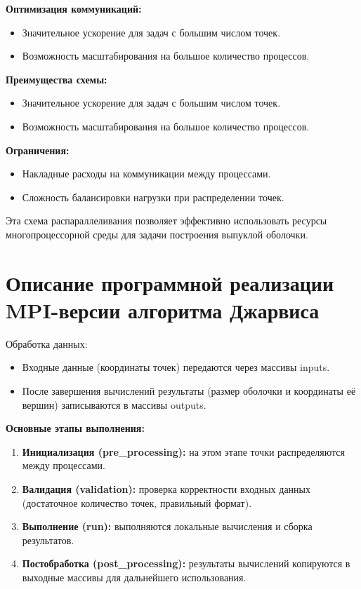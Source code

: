 \documentclass[a4paper,12pt]{article}
\begin{document}
\textbf{Оптимизация коммуникаций:}
\begin{itemize}
    \item Значительное ускорение для задач с большим числом точек.
    \item Возможность масштабирования на большое количество процессов.
\end{itemize}

\textbf{Преимущества схемы:}
\begin{itemize}
    \item Значительное ускорение для задач с большим числом точек.
    \item Возможность масштабирования на большое количество процессов.
\end{itemize}

\textbf{Ограничения:}
\begin{itemize}
    \item Накладные расходы на коммуникации между процессами.
    \item Сложность балансировки нагрузки при распределении точек.
\end{itemize}

Эта схема распараллеливания позволяет эффективно использовать ресурсы многопроцессорной среды для задачи построения выпуклой оболочки.

\newpage

\section{Описание программной реализации MPI-версии алгоритма Джарвиса}
Обработка данных:
\begin{itemize}
    \item Входные данные (координаты точек) передаются через массивы inputs.
    \item После завершения вычислений результаты (размер оболочки и координаты её вершин) записываются в массивы outputs.
\end{itemize}

\textbf{Основные этапы выполнения:}
\begin{enumerate}
    \item \textbf{Инициализация (pre\_processing):} на этом этапе точки распределяются между процессами.
    \item \textbf{Валидация (validation):} проверка корректности входных данных (достаточное количество точек, правильный формат).
    \item \textbf{Выполнение (run):} выполняются локальные вычисления и сборка результатов.
    \item \textbf{Постобработка (post\_processing):} результаты вычислений копируются в выходные массивы для дальнейшего использования.
\end{enumerate}
\end{document}
